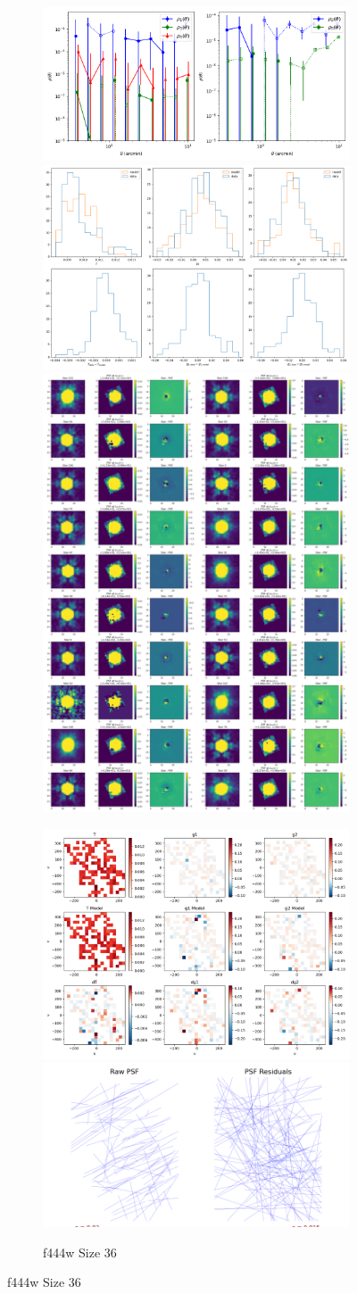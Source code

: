 \documentclass[a4 paper]{article}
\numberwithin{equation}{section}
\newcommand{\0}{\mathbf{0}}
\begin{document}
\newpage
\begin{figure}[!h]
  \begin{subfigure}{\linewidth}
  \includegraphics[width=.3\linewidth]{444wSize36/piff_rho.png}\hfill
  \includegraphics[width=.3\linewidth]{444wSize36/piff_shapes.png}\hfill
  \includegraphics[width=.3\linewidth]{444wSize36/piff_stars.png}
  \end{subfigure}\par\medskip
  \begin{subfigure}{\linewidth}
  \includegraphics[width=.3\linewidth]{444wSize36/piff_twod.png}\hfill
  \includegraphics[width=.3\linewidth]{444wSize36/piff_whisker.png}\hfill
  \caption{f444w Size 36}
  \end{subfigure}\par\medskip


\end{figure}\\ 
\newpage
\end{document}
